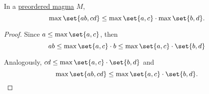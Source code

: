 \begin{lemma}\label{thm:preordered_magma_max_distributivity}
  In a \hyperref[def:ordered_magma]{preordered magma} \( M \),
  \begin{equation}\label{eq:thm:preordered_magma_max_distributivity}
    \max \set{a b, c d} \leq \max \set{a, c} \cdot \max \set{b, d}.
  \end{equation}
\end{lemma}
\begin{proof}
  Since \( a \leq \max \set{a, c} \), then
  \begin{equation*}
    ab
    \leq
    \max \set{a, c} \cdot b
    \leq
    \max \set{a, c} \cdot \set{b, d}
  \end{equation*}

  Analogously, \( cd \leq \max \set{a, c} \cdot \set{b, d} \) and
  \begin{equation*}
    \max \set{a b, c d} \leq \max \set{a, c} \cdot \set{b, d}.
  \end{equation*}
\end{proof}

